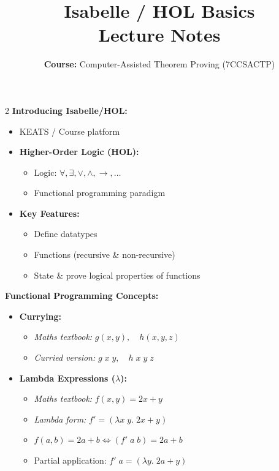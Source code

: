 \documentclass[10pt,a4paper]{article}
\title{\textbf{\huge Isabelle / HOL Basics}\\[0.3em]
\large Lecture Notes}
\author{\textbf{Course:} Computer-Assisted Theorem Proving (7CCSACTP)}
\date{}
\begin{document}
\maketitle
\vspace{-1.5em}

\begin{tcolorbox}[title=1. Introduction \& Functional Programming Concepts]
\begin{multicols}{2}
\textbf{Introducing Isabelle/HOL:}
\begin{itemize}[leftmargin=1.2em, itemsep=2pt]
    \item KEATS / Course platform
    \item \textbf{Higher-Order Logic (HOL):}
    \begin{itemize}[leftmargin=1em, label=$\bullet$]
        \item Logic: $\forall, \exists, \lor, \land, \rightarrow, \dots$
        \item Functional programming paradigm
    \end{itemize}
    \item \textbf{Key Features:}
    \begin{itemize}[leftmargin=1em, label=$\bullet$]
        \item Define datatypes
        \item Functions (recursive \& non-recursive)
        \item State \& prove logical properties of functions
    \end{itemize}
\end{itemize}

\columnbreak

\textbf{Functional Programming Concepts:}
\begin{itemize}[leftmargin=1.2em, itemsep=2pt]
    \item \textbf{Currying:}
    \begin{itemize}[leftmargin=1em, label=$\Rightarrow$]
        \item \textit{Maths textbook:} $g(x,y), \quad h(x,y,z)$
        \item \textit{Curried version:} $g\;x\;y, \quad h\;x\;y\;z$
    \end{itemize}
    
    \item \textbf{Lambda Expressions ($\lambda$):}
    \begin{itemize}[leftmargin=1em, label=$\Rightarrow$]
        \item \textit{Maths textbook:} $f(x,y) = 2x + y$
        \item \textit{Lambda form:} $f' = (\lambda x\; y.\; 2x + y)$
        \item $f(a,b) = 2a + b \iff (f'\; a\; b) = 2a + b$
        \item Partial application: $f'\; a = (\lambda y.\; 2a + y)$
    \end{itemize}
\end{itemize}
\end{multicols}
\end{tcolorbox}
\end{document}
